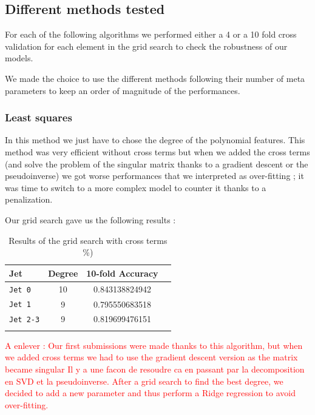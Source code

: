 \documentclass[10pt,conference,compsocconf]{IEEEtran}
\begin{document}
\subsection{Different methods tested}

For each of the following algorithms we performed either a 4 or a 10 fold cross validation for each element in the grid search to check the robustness of our models.

We made the choice to use the different methods following their number of meta parameters to keep an order of magnitude of the performances.

\subsubsection{Least squares}

In this method we just have to chose the degree of the polynomial features. This method was very efficient without cross terms but when we added the cross terms (and solve the problem of the singular matrix thanks to a gradient descent or the pseudoinverse) we got worse performances that we interpreted as over-fitting ; it was time to switch to a more complex model to counter it thanks to a penalization.

Our grid search gave us the following results : 

\begin{table}[h!]
\centering
\caption{Results of the grid search with cross terms \%)}
\footnotesize
\hspace{-0.2cm}
\begin{tabular}{ l| ccc } 
 \hline
   Jet & Degree & 10-fold Accuracy  \\
 \hline
   \verb+Jet 0+  & 10 &  0.843138824942 \\
   \verb+Jet 1+  & 9 & 0.795550683518 \\
   \verb+Jet 2-3+  & 9 & 0.819699476151 \\
  \hline
\label{grid_search_ridge_cross}
\end{tabular}
\end{table}

\textcolor{red}{A enlever : Our first submissions were made thanks to this algorithm, but when we added cross terms we had to use the gradient descent version as the matrix became singular Il y a une facon de resoudre ca en passant par la decomposition en SVD et la pseudoinverse. After a grid search to find the best degree, we decided to add a new parameter and thus perform a Ridge regression to avoid over-fitting. }
\end{document}

